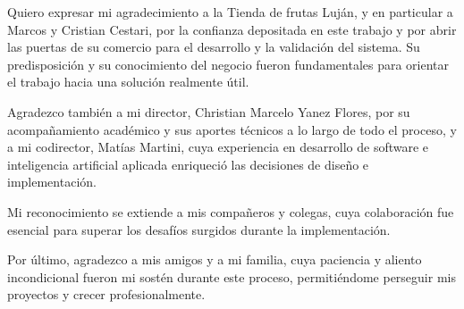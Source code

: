 \documentclass[
    11pt,
    spanish,
    singlespacing,
    parskip,
    headsepline,
    bookmarks=true,
    unicode=true,
    pdftoolbar=true,
    pdfmenubar=true,
    pdffitwindow=false,
    colorlinks=true,
    linkcolor=blue,
    citecolor=blue,
    urlcolor=blue
]{MastersDoctoralThesis}
\begin{document}
\begin{acknowledgements}
    \vspace{1.5cm}
    Quiero expresar mi agradecimiento a la Tienda de frutas Luján, y en particular a Marcos y Cristian Cestari, por la confianza depositada en este trabajo y por abrir las puertas de su comercio para el desarrollo y la validación del sistema. Su predisposición y su conocimiento del negocio fueron fundamentales para orientar el trabajo hacia una solución realmente útil.

    Agradezco también a mi director, Christian Marcelo Yanez Flores, por su acompañamiento académico y sus aportes técnicos a lo largo de todo el proceso, y a mi codirector, Matías Martini, cuya experiencia en desarrollo de software e inteligencia artificial aplicada enriqueció las decisiones de diseño e implementación.

    Mi reconocimiento se extiende a mis compañeros y colegas, cuya colaboración fue esencial para superar los desafíos surgidos durante la implementación.

    Por último, agradezco a mis amigos y a mi familia, cuya paciencia y aliento incondicional fueron mi sostén durante este proceso, permitiéndome perseguir mis proyectos y crecer profesionalmente.
\end{acknowledgements}


\tableofcontents
\listoffigures
\listoftables




\mainmatter %
\pagestyle{thesis} %






\end{document}
